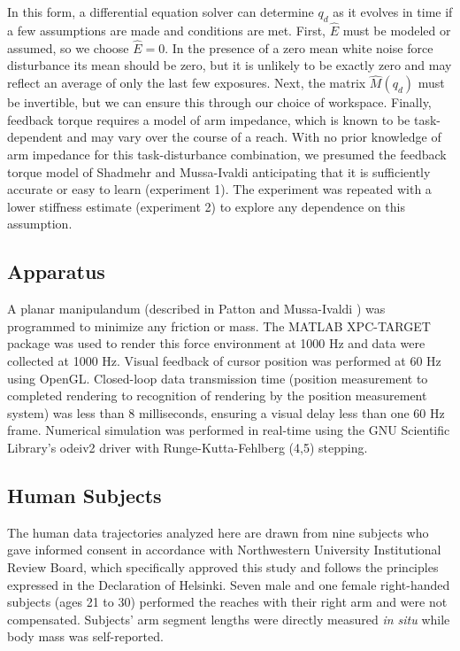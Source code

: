 \documentclass{frontiersSCNS} %
\begin{document}
\begin{methods}
In this form, a differential equation solver can determine $q_d$ as it evolves in time if a few assumptions are made and conditions are met. First, $\hat{E}$ must be modeled or assumed, so we choose $\hat{E}=0$. In the presence of a zero mean white noise force disturbance its mean should be zero, but it is unlikely to be exactly zero and may reflect an average of only the last few exposures\citep{scheidt2001learning}. Next, the matrix $\hat{M}(q_d)$ must be invertible, but we can ensure this through our choice of workspace. Finally, feedback torque requires a model of arm impedance, which is known to be task-dependent\citep{gomi1998task} and may vary over the course of a reach\citep{niu2010temporal}. With no prior knowledge of arm impedance for this task-disturbance combination, we presumed the feedback torque model of Shadmehr and Mussa-Ivaldi anticipating that it is sufficiently accurate or easy to learn (experiment 1). The experiment was repeated with a lower stiffness estimate (experiment 2) to explore any dependence on this assumption.

\subsection{Apparatus}
A planar manipulandum (described in Patton and Mussa-Ivaldi \cite{patton2004robot}) was programmed to minimize any friction or mass. The MATLAB XPC-TARGET package \citep{MATLAB:2008} was used to render this force environment at 1000 Hz and data were collected at 1000 Hz.  Visual feedback of cursor position was performed at 60 Hz using OpenGL. Closed-loop data transmission time (position measurement to completed rendering to recognition of rendering by the position measurement system) was less than 8 milliseconds, ensuring a visual delay less than one 60 Hz frame. Numerical simulation was performed in real-time using the GNU Scientific Library's odeiv2 driver with Runge-Kutta-Fehlberg (4,5) stepping\cite{gough2009gnu}.

\subsection{Human Subjects}
The human data trajectories analyzed here are drawn from nine subjects who gave informed consent in accordance with Northwestern University Institutional Review Board, which specifically approved this study and follows the principles expressed in the Declaration of Helsinki. Seven male and one female right-handed subjects (ages 21 to 30) performed the reaches with their right arm and were not compensated. Subjects' arm segment lengths were directly measured \textit{in situ} while body mass was self-reported.


\end{methods}
\end{document}
